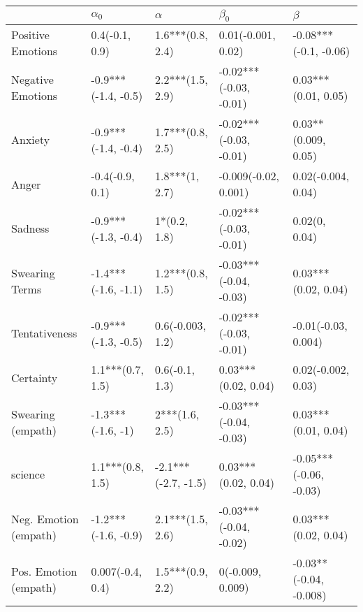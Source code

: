 \begin{tabular}{lllll}
\toprule
{} &           $\alpha_0$ &             $\alpha$ &               $\beta_0$ &                 $\beta$ \\
\midrule
Positive Emotions     &       0.4(-0.1, 0.9) &     1.6***(0.8, 2.4) &      0.01(-0.001, 0.02) &   -0.08***(-0.1, -0.06) \\
Negative Emotions     &  -0.9***(-1.4, -0.5) &     2.2***(1.5, 2.9) &  -0.02***(-0.03, -0.01) &     0.03***(0.01, 0.05) \\
Anxiety               &  -0.9***(-1.4, -0.4) &     1.7***(0.8, 2.5) &  -0.02***(-0.03, -0.01) &     0.03**(0.009, 0.05) \\
Anger                 &      -0.4(-0.9, 0.1) &       1.8***(1, 2.7) &    -0.009(-0.02, 0.001) &      0.02(-0.004, 0.04) \\
Sadness               &  -0.9***(-1.3, -0.4) &         1*(0.2, 1.8) &  -0.02***(-0.03, -0.01) &           0.02(0, 0.04) \\
Swearing Terms        &  -1.4***(-1.6, -1.1) &     1.2***(0.8, 1.5) &  -0.03***(-0.04, -0.03) &     0.03***(0.02, 0.04) \\
Tentativeness         &  -0.9***(-1.3, -0.5) &     0.6(-0.003, 1.2) &  -0.02***(-0.03, -0.01) &     -0.01(-0.03, 0.004) \\
Certainty             &     1.1***(0.7, 1.5) &       0.6(-0.1, 1.3) &     0.03***(0.02, 0.04) &      0.02(-0.002, 0.03) \\
Swearing (empath)     &    -1.3***(-1.6, -1) &       2***(1.6, 2.5) &  -0.03***(-0.04, -0.03) &     0.03***(0.01, 0.04) \\
science               &     1.1***(0.8, 1.5) &  -2.1***(-2.7, -1.5) &     0.03***(0.02, 0.04) &  -0.05***(-0.06, -0.03) \\
Neg. Emotion (empath) &  -1.2***(-1.6, -0.9) &     2.1***(1.5, 2.6) &  -0.03***(-0.04, -0.02) &     0.03***(0.02, 0.04) \\
Pos. Emotion (empath) &     0.007(-0.4, 0.4) &     1.5***(0.9, 2.2) &        0(-0.009, 0.009) &  -0.03**(-0.04, -0.008) \\
\bottomrule
\end{tabular}

